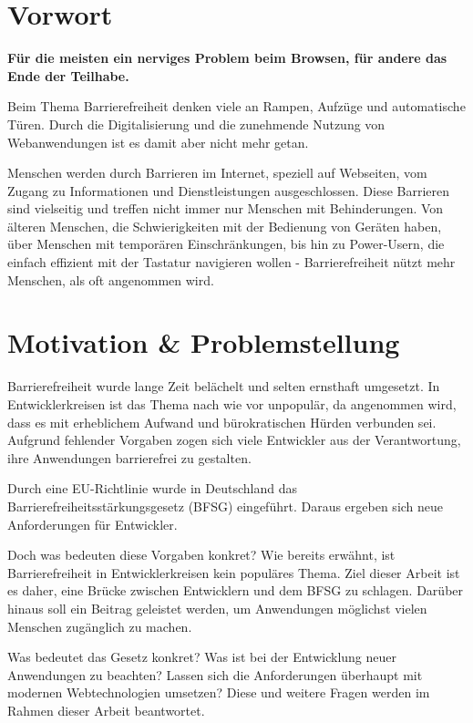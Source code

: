 \section{Vorwort}
\label{sec:vorwort}
\begin{tcolorbox}[boxrule=0pt,sharp corners,enhanced,borderline west={2pt}{0pt}{blue}]
    \textbf{Für die meisten ein nerviges Problem beim Browsen, für andere das Ende der Teilhabe.}
\end{tcolorbox}
Beim Thema Barrierefreiheit denken viele an Rampen, Aufzüge und automatische Türen. Durch die Digitalisierung und die zunehmende Nutzung von Webanwendungen ist es damit aber nicht mehr getan.

Menschen werden durch Barrieren im Internet, speziell auf Webseiten, vom Zugang zu Informationen und Dienstleistungen ausgeschlossen. Diese Barrieren sind vielseitig und treffen nicht immer nur Menschen mit Behinderungen. Von älteren Menschen, die Schwierigkeiten mit der Bedienung von Geräten haben, über Menschen mit temporären Einschränkungen, bis hin zu Power-Usern, die einfach effizient mit der Tastatur navigieren wollen - Barrierefreiheit nützt mehr Menschen, als oft angenommen wird.

\section{Motivation \& Problemstellung} 
\label{sec:motivation}

Barrierefreiheit wurde lange Zeit belächelt und selten ernsthaft umgesetzt. In Entwicklerkreisen ist das Thema nach wie vor unpopulär, da angenommen wird, dass es mit erheblichem Aufwand und bürokratischen Hürden verbunden sei. Aufgrund fehlender Vorgaben zogen sich viele Entwickler aus der Verantwortung, ihre Anwendungen barrierefrei zu gestalten.

Durch eine EU-Richtlinie wurde in Deutschland das Barrierefreiheitsstärkungsgesetz (BFSG) eingeführt. Daraus ergeben sich neue Anforderungen für Entwickler. 

Doch was bedeuten diese Vorgaben konkret? Wie bereits erwähnt, ist Barrierefreiheit in Entwicklerkreisen kein populäres Thema. Ziel dieser Arbeit ist es daher, eine Brücke zwischen Entwicklern und dem BFSG zu schlagen. Darüber hinaus soll ein Beitrag geleistet werden, um Anwendungen möglichst vielen Menschen zugänglich zu machen.

Was bedeutet das Gesetz konkret? Was ist bei der Entwicklung neuer Anwendungen zu beachten? Lassen sich die Anforderungen überhaupt mit modernen Webtechnologien umsetzen? Diese und weitere Fragen werden im Rahmen dieser Arbeit beantwortet.

